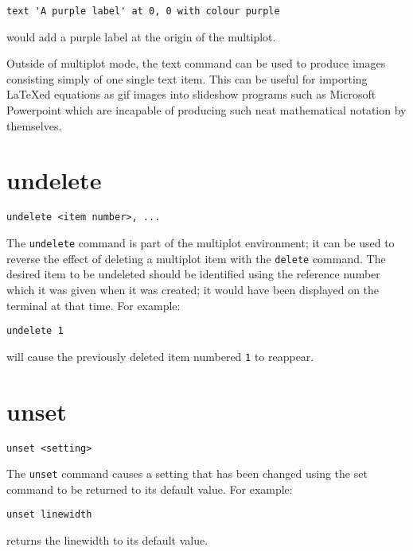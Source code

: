 \begin{verbatim}
text 'A purple label' at 0, 0 with colour purple
\end{verbatim}

\noindent would add a purple label at the origin of the multiplot.

Outside of multiplot mode, the text command can be used to produce images
consisting simply of one single text item. This can be useful for importing
\LaTeX ed equations as gif images into slideshow programs such as Microsoft
Powerpoint which are incapable of producing such neat mathematical notation
by themselves.

\section{undelete}

\begin{verbatim}
undelete <item number>, ...
\end{verbatim}

The {\tt undelete} command is part of the multiplot environment; it can be used
to reverse the effect of deleting a multiplot item with the {\tt delete}
command. The desired item to be undeleted should be identified using the
reference number which it was given when it was created; it would have been
displayed on the terminal at that time. For example:

\begin{verbatim}
undelete 1
\end{verbatim}

\noindent will cause the previously deleted item numbered {\tt 1} to reappear.
  
\section{unset}

\begin{verbatim}
unset <setting>
\end{verbatim}

The {\tt unset} command causes a setting that has been changed using the set
command to be returned to its default value.  For example:

\begin{verbatim}
unset linewidth
\end{verbatim}

\noindent returns the linewidth to its default value.


